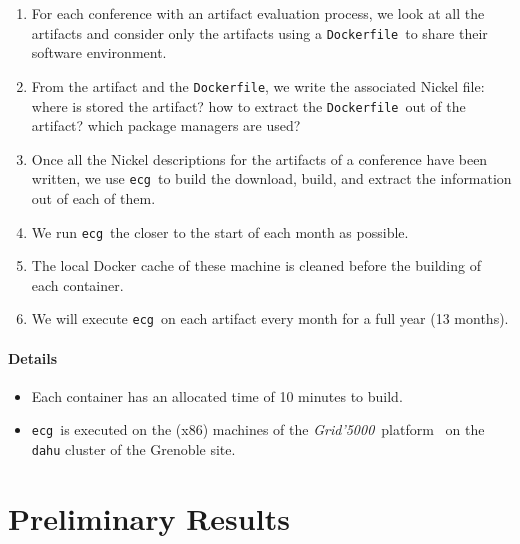 \documentclass[sigconf,natbib=false]{acmart}
\newcommand{\grid}{\emph{Grid'5000}}
\newcommand{\df}{\texttt{Dockerfile}}
\newcommand{\ecg}{\texttt{ecg}}
\newcommand{\todo}[1]{{\color{red}{TODO: #1}}}
\begin{document}
\begin{enumerate}
\item For each conference with an artifact evaluation process, we look at all the artifacts and consider only the artifacts using a \df\ to share their software environment.
\item From the artifact and the \df, we write the associated Nickel file: where is stored the artifact? how to extract the \df\ out of the artifact? which package managers are used?
\item Once all the Nickel descriptions for the artifacts of a conference have been written, we use \ecg\ to build the download, build, and extract the information out of each of them.
\item We run \ecg\ the closer to the start of each month as possible.
\item The local Docker cache of these machine is cleaned before the building of each container.
\item We will execute \ecg\ on each artifact every month for a full year (13 months).
\end{enumerate}

\paragraph{Details}

\begin{itemize}
\item Each container has an allocated time of 10 minutes to build.
\item \ecg\ is executed on the (x86) machines of the \grid\ platform~\cite{grid5000} on the \texttt{dahu} cluster of the Grenoble site.
\end{itemize}



% 

\section{Preliminary Results}\label{sec:results}
\end{document}
